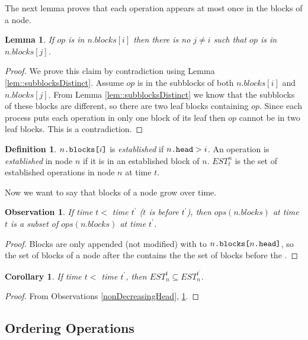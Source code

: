\documentclass[10pt]{article}
\renewcommand{\it}[1]{\textit{#1}}
\newcommand{\nf}[1]{{\normalfont{\texttt{#1}}}}
\newtheorem{lemma}[theorem]{Lemma}
\newtheorem{corollary}[theorem]{Corollary}
\newtheorem{observation}[theorem]{Observation}
\theoremstyle{definition}
\newtheorem{definition}[theorem]{Definition}
\begin{document}
The next lemma proves that each operation appears at most once in the blocks of a node.
\begin{lemma}\label{lem::noDuplicates}
If $op$ is in $n.blocks[i]$ then there is no $j\neq i$ such that $op$ is in $n.blocks[j]$.
\end{lemma}
\begin{proof}
We prove this claim by contradiction using Lemma \ref{lem::subblocksDistinct}. Assume $op$ is in the subblocks of both $n.blocks[i]$ and $n.blocks[j]$. From Lemma \ref{lem::subblocksDistinct} we know that the subblocks of these blocks are different, so there are two leaf blocks containing $op$. Since each process puts each operation in only one block of its leaf then $op$ cannot be in two leaf blocks. This is a contradiction.
\end{proof}

\begin{definition}
$n\nf{.blocks[}i\nf{]}$ is \emph{established} if $n\nf{.head}>i$. An operation is \it{established} in node $n$ if it is in an established block of $n$. $EST^n_t$ is the set of established operations in node $n$ at time $t$.
\end{definition}

Now we want to say that blocks of a node grow over time.
\begin{observation}\label{lem::blocksOrder}
  If  time $t<$ time $t^\prime$ ($t$ is before $t^\prime$), then $ops(n.blocks)$ at time $t$ is a subset of $ops(n.blocks)$ at time $t^\prime$.
\end{observation}
\begin{proof}
Blocks are only appended (not modified) with \nf{CAS} to $n\nf{.blocks[}n\nf{.head]}$, so the set of blocks of a node after the \nf{CAS} contains the the set of blocks before the \nf{CAS}.
\end{proof}

\begin{corollary}\label{lem::establishedOrder}
  If  time $t<$ time $t^\prime$, then $EST_n^t\subseteq EST_n^{t^\prime}$.
\end{corollary}
\begin{proof}
From Observations \ref{nonDecreasingHead}, \ref{lem::blocksOrder}.  
\end{proof}

\pagebreak

\subsection{Ordering Operations}
\end{document}
